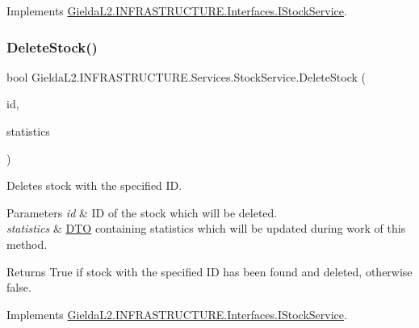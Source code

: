 Implements \mbox{\hyperlink{interface_gielda_l2_1_1_i_n_f_r_a_s_t_r_u_c_t_u_r_e_1_1_interfaces_1_1_i_stock_service_a6f46f5fa67e7cc83b8b7cbb3a68345ea}{Gielda\+L2.\+I\+N\+F\+R\+A\+S\+T\+R\+U\+C\+T\+U\+R\+E.\+Interfaces.\+I\+Stock\+Service}}.

\mbox{\label{class_gielda_l2_1_1_i_n_f_r_a_s_t_r_u_c_t_u_r_e_1_1_services_1_1_stock_service_af134b397a338fcd778177bb0a4960060}} 
\subsubsection{\texorpdfstring{DeleteStock()}{DeleteStock()}}
{\footnotesize\ttfamily bool Gielda\+L2.\+I\+N\+F\+R\+A\+S\+T\+R\+U\+C\+T\+U\+R\+E.\+Services.\+Stock\+Service.\+Delete\+Stock (\begin{DoxyParamCaption}\item[{int}]{id,  }\item[{\mbox{\hyperlink{class_gielda_l2_1_1_i_n_f_r_a_s_t_r_u_c_t_u_r_e_1_1_d_t_o_1_1_statistics_d_t_o}{Statistics\+D\+TO}}}]{statistics }\end{DoxyParamCaption})}



Deletes stock with the specified ID. 


\begin{DoxyParams}{Parameters}
{\em id} & ID of the stock which will be deleted.\\
\hline
{\em statistics} & \mbox{\hyperlink{namespace_gielda_l2_1_1_i_n_f_r_a_s_t_r_u_c_t_u_r_e_1_1_d_t_o}{D\+TO}} containing statistics which will be updated during work of this method.\\
\hline
\end{DoxyParams}
\begin{DoxyReturn}{Returns}
True if stock with the specified ID has been found and deleted, otherwise false.
\end{DoxyReturn}


Implements \mbox{\hyperlink{interface_gielda_l2_1_1_i_n_f_r_a_s_t_r_u_c_t_u_r_e_1_1_interfaces_1_1_i_stock_service_aaee8771ad67aa0e4ecd5a53a1defa1aa}{Gielda\+L2.\+I\+N\+F\+R\+A\+S\+T\+R\+U\+C\+T\+U\+R\+E.\+Interfaces.\+I\+Stock\+Service}}.

